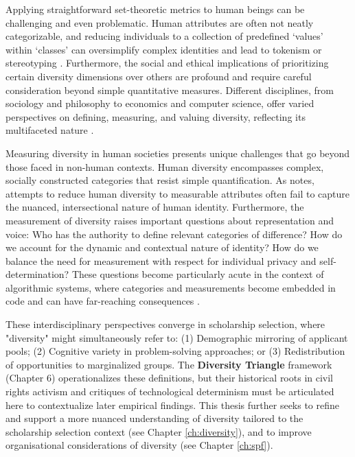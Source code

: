 Applying straightforward set-theoretic metrics to human beings can be challenging and even problematic. Human attributes are often not neatly categorizable, and reducing individuals to a collection of predefined `values' within `classes' can oversimplify complex identities and lead to tokenism or stereotyping \cite{Steel_Multiple_2018}. Furthermore, the social and ethical implications of prioritizing certain diversity dimensions over others are profound and require careful consideration beyond simple quantitative measures. Different disciplines, from sociology and philosophy to economics and computer science, offer varied perspectives on defining, measuring, and valuing diversity, reflecting its multifaceted nature \cite{Stirling_General_2007,Mitchell_Diversity_2020,Steel_Multiple_2018}.

Measuring diversity in human societies presents unique challenges that go beyond those faced in non-human contexts. Human diversity encompasses complex, socially constructed categories that resist simple quantification. As \textcite{scheuerman2019computers} notes, attempts to reduce human diversity to measurable attributes often fail to capture the nuanced, intersectional nature of human identity. Furthermore, the measurement of diversity raises important questions about representation and voice: Who has the authority to define relevant categories of difference? How do we account for the dynamic and contextual nature of identity? How do we balance the need for measurement with respect for individual privacy and self-determination? These questions become particularly acute in the context of algorithmic systems, where categories and measurements become embedded in code and can have far-reaching consequences \cite{bowker1999sorting}.

These interdisciplinary perspectives converge in scholarship selection, where "diversity" might simultaneously refer to: (1) Demographic mirroring of applicant pools; (2) Cognitive variety in problem-solving approaches; or (3) Redistribution of opportunities to marginalized groups. The \textbf{Diversity Triangle} framework (Chapter 6) operationalizes these definitions, but their historical roots in civil rights activism and critiques of technological determinism \cite{winner1980artefacts} must be articulated here to contextualize later empirical findings. This thesis further seeks to refine and support a more nuanced understanding of diversity tailored to the scholarship selection context (see Chapter \ref{ch:diversity}), and to improve organisational considerations of diversity (see Chapter \ref{ch:spf}).

